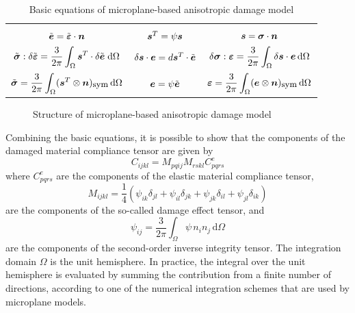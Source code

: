 \documentclass[epsf,a4paper]{article}
\newcommand{\mbf}[1]{\mbox{\boldmath$#1$}}
\newcommand{\ve}{\mbf{e}}             %
\newcommand{\vet}{\tilde{\ve}}
\newcommand{\veps}{\mbf{\varepsilon}}        %
\newcommand{\vsig}{\mbf{\sigma}}             %
\newcommand{\vs}{\mbf{s}}             %
\newcommand{\vepst}{\tilde{\veps}}
\newcommand{\vst}{\mbf{s}^T}          %
\newcommand{\vsigt}{\tilde{\vsig}}
\newcommand{\dvepst}{\delta\tilde{\veps}}
\newcommand{\dvet}{\delta\vet}
\newcommand{\dvs}{\delta\vs}
\newcommand{\dvsig}{\delta\vsig}
\newcommand{\dO}{\,\mbox{d}\Omega}
\newcommand{\sym}{_{\mbox{\small sym}}}
\newcommand{\quarter}{\mbox{$\frac{1}{4}$}}
\begin{document}
\begin{table}[h]
\caption{Basic equations of microplane-based anisotropic damage model}
\label{tab2}
\begin{center}
\begin{tabular}{|c|c|c|}
\hline
&&\\
$\vet=\vepst\cdot\mbf{n}$ 
&
$\vst = \psi\vs$ 
&
$\vs=\vsig\cdot\mbf{n}$ 
\\[5mm]
$\vsigt:\dvepst = \displaystyle\frac{3}{2\pi} \int_{\Omega}\vst\cdot\dvet\;\mbox{d}\Omega$
& 
$\dvs\cdot\ve=d\vst\cdot\vet$ 
&
$\dvsig:\veps = \displaystyle\frac{3}{2\pi} \int_{\Omega}\dvs\cdot\ve\dO$
\\[5mm]
$\vsigt = \displaystyle\frac{3}{2\pi}\int_\Omega (\vst\otimes\mbf{n})\sym\dO$
&
$\ve=\psi\vet$
&
$\veps = \displaystyle\frac{3}{2\pi}\int_\Omega (\ve\otimes\mbf{n})\sym\dO$
\\[5mm]
\hline
\end{tabular}
\end{center}
\end{table}

\begin{figure}
\centerline{}
\caption{Structure of microplane-based anisotropic damage model}
\label{ff4}
\end{figure}

Combining the basic equations, it is possible to show that the 
components of the damaged
material compliance tensor are given by 
\begin{equation}
\label{damcom}
C_{ijkl}=M_{pqij}M_{rskl}C^e_{pqrs}
\end{equation}
where $C^e_{pqrs}$ are the components of the elastic material compliance tensor,
\begin{equation}
\label{ee27}
M_{ijkl} = \quarter\left(
\psi_{ik}\delta_{jl}+\psi_{il}\delta_{jk}+\psi_{jk}\delta_{il}+\psi_{jl}\delta_{ik}\right)
\end{equation}
are the components of the so-called damage effect tensor, and
\begin{equation}
\label{ee24}
\psi_{ij} = \frac{3}{2\pi}\int_\Omega \psi\, n_i n_j \dO
\end{equation}
are the components of the second-order inverse integrity tensor.
The integration domain $\Omega$ is the unit hemisphere.
In practice, the integral over the unit hemisphere is evaluated by
summing the contribution from a finite number of directions, according
to one of the numerical integration schemes that are used by microplane
models. 
\end{document}
